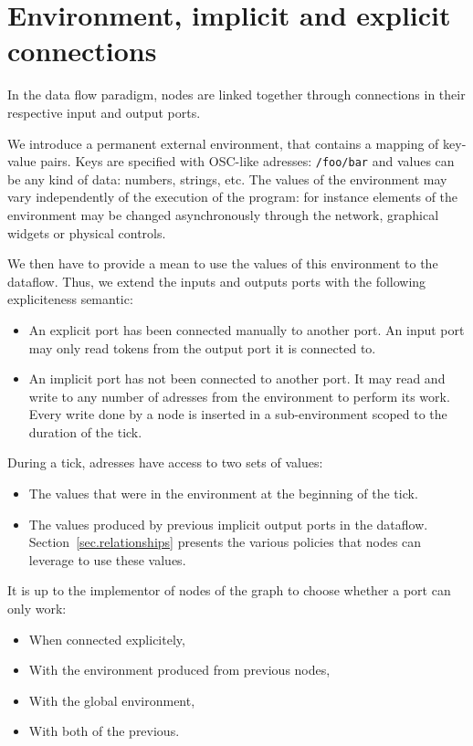 \documentclass{article}
\begin{document}
    \section{Environment, implicit and explicit connections}
    In the data flow paradigm, nodes are linked together through connections in their respective input and output ports.
    
    We introduce a permanent external environment, that contains a mapping of key-value pairs.
    Keys are specified with OSC-like\cite{osc} adresses: \lstinline|/foo/bar| and values can be any kind of data: numbers, strings, etc. 
    The values of the environment may vary independently of the execution of the program: for instance elements of the environment may be changed asynchronously through the network, graphical widgets or physical controls.
    
    We then have to provide a mean to use the values of this environment to the dataflow.
    Thus, we extend the inputs and outputs ports with the following expliciteness semantic: 
    
    \begin{itemize}
        \item An explicit port has been connected manually to another port.
        An input port may only read tokens from the output port it is connected to.

        \item An implicit port has not been connected to another port. 
        It may read and write to any number of adresses from the environment to perform its work.
        Every write done by a node is inserted in a sub-environment scoped to the duration of the tick.
    \end{itemize}
    
    During a tick, adresses have access to two sets of values: 
    \begin{itemize}
        \item The values that were in the environment at the beginning of the tick.
        \item The values produced by previous implicit output ports in the dataflow.
        Section~\ref{sec.relationships} presents the various policies that nodes can leverage to 
        use these values.
    \end{itemize}

    It is up to the implementor of nodes of the graph to choose whether a port can only work: 
    \begin{itemize}
        \item When connected explicitely,
        \item With the environment produced from previous nodes,
        \item With the global environment,
        \item With both of the previous.
    \end{itemize} 
\end{document}
